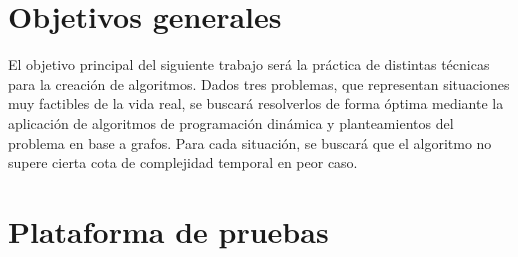 \documentclass[a4paper]{article}
\begin{document}

\thispagestyle{empty}

\maketitle
\newpage

\thispagestyle{empty}
\vfill
%	
%

\thispagestyle{empty}
\vspace{1.5cm}
\tableofcontents
\newpage


\newpage
\section{Objetivos generales}
El objetivo principal del siguiente trabajo será la práctica de distintas técnicas para la creación de algoritmos. Dados tres problemas, que representan situaciones muy factibles de la vida real, se buscará resolverlos de forma óptima mediante la aplicación de algoritmos de programación dinámica y planteamientos del problema en base a grafos. Para cada situación, se buscará que el algoritmo no supere cierta cota de complejidad temporal en peor caso.

\section{Plataforma de pruebas}
\end{document}
